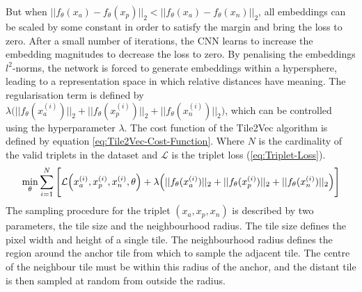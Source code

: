 \newline
\newline
But when $||f_\theta(x_a) - f_\theta(x_p)||_2 < ||f_\theta(x_a) - f_\theta(x_n)||_2$, all embeddings can be scaled by some constant in order to satisfy the margin and bring the loss to zero. After a small number of iterations, the \gls{CNN} learns to increase the embedding magnitudes to decrease the loss to zero. By penalising the embeddings $l^2$-norms, the network is forced to generate embeddings within a hypersphere, leading to a representation space in which relative distances have meaning. The regularisation term is defined by $\lambda \Big(||f_\theta(x_a^{(i)})||_2 + ||f_\theta(x_p^{(i)})||_2 + ||f_\theta(x_n^{(i)})||_2\Big)$, which can be controlled using the hyperparameter $\lambda$. The cost function of the Tile2Vec algorithm is defined by equation \ref{eq:Tile2Vec-Cost-Function}. Where $N$ is the cardinality of the valid triplets in the dataset and $\mathcal{L}$ is the triplet loss (\ref{eq:Triplet-Loss}).
\begin{equation}
    \centering
    \min_\theta \sum_{i=1}^N \Bigg[\mathcal{L}\Big(x_a^{(i)}, x_p^{(i)}, x_n^{(i)}, \theta\Big) + \lambda \Big(||f_\theta(x_a^{(i)})||_2 + ||f_\theta(x_p^{(i)})||_2 + ||f_\theta(x_n^{(i)})||_2\Big)\Bigg]
    \label{eq:Tile2Vec-Cost-Function}
\end{equation}
The sampling procedure for the triplet $(x_a, x_p, x_n)$ is described by two parameters, the tile size and the neighbourhood radius. The tile size defines the pixel width and height of a single tile. The neighbourhood radius defines the region around the anchor tile from which to sample the adjacent tile. The centre of the neighbour tile must be within this radius of the anchor, and the distant tile is then sampled at random from outside the radius.

